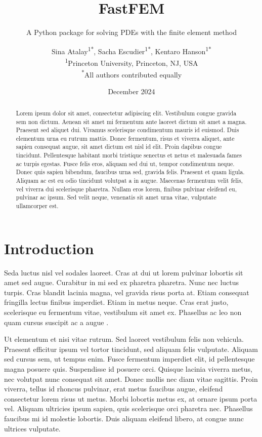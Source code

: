 \documentclass[headings=standardclasses, abstract=true]{scrartcl}
\title{FastFEM}
\subtitle{A Python package for solving PDEs with the finite element method}
\author{
    Sina Atalay\textsuperscript{1*}, Sacha Escudier\textsuperscript{1*}, Kentaro Hanson\textsuperscript{1*} \\
    {\footnotesize \textsuperscript{1}Princeton University, Princeton, NJ, USA}\\
    {\footnotesize \textsuperscript{*}All authors contributed equally}
}
\date{
    \normalsize December 2024
}
\begin{document}
\maketitle

\begin{abstract}
\noindent Lorem ipsum dolor sit amet, consectetur adipiscing elit. Vestibulum congue gravida sem non dictum. Aenean sit amet mi fermentum ante laoreet dictum sit amet a magna. Praesent sed aliquet dui. Vivamus scelerisque condimentum mauris id euismod. Duis elementum urna eu rutrum mattis. Donec fermentum, risus et viverra aliquet, ante sapien consequat augue, sit amet dictum est nisl id elit. Proin dapibus congue tincidunt. Pellentesque habitant morbi tristique senectus et netus et malesuada fames ac turpis egestas. Fusce felis eros, aliquam sed dui ut, tempor condimentum neque. Donec quis sapien bibendum, faucibus urna sed, gravida felis. Praesent et quam ligula. Aliquam ac est eu odio tincidunt volutpat a in augue. Maecenas fermentum velit felis, vel viverra dui scelerisque pharetra. Nullam eros lorem, finibus pulvinar eleifend eu, pulvinar ac ipsum. Sed velit neque, venenatis sit amet urna vitae, vulputate ullamcorper est. 
\end{abstract}

\section{Introduction}

Seda luctus nisl vel sodales laoreet. Cras at dui ut lorem pulvinar lobortis sit amet sed augue. Curabitur in mi sed ex pharetra pharetra. Nunc nec luctus turpis. Cras blandit lacinia magna, vel gravida risus porta at. Etiam consequat fringilla lectus finibus imperdiet. Etiam in metus neque. Cras erat justo, scelerisque eu fermentum vitae, vestibulum sit amet ex. Phasellus ac leo non quam cursus suscipit ac a augue \cite{Serway2014}.

Ut elementum et nisi vitae rutrum. Sed laoreet vestibulum felis non vehicula. Praesent efficitur ipsum vel tortor tincidunt, sed aliquam felis vulputate. Aliquam sed cursus sem, ut tempus enim. Fusce fermentum imperdiet elit, id pellentesque magna posuere quis. Suspendisse id posuere orci. Quisque lacinia viverra metus, nec volutpat nunc consequat sit amet. Donec mollis nec diam vitae sagittis. Proin viverra, tellus id rhoncus pulvinar, erat metus faucibus augue, eleifend consectetur lorem risus ut metus. Morbi lobortis metus ex, at ornare ipsum porta vel. Aliquam ultricies ipsum sapien, quis scelerisque orci pharetra nec. Phasellus faucibus mi id molestie lobortis. Duis aliquam eleifend libero, at congue nunc ultrices vulputate.
\end{document}
